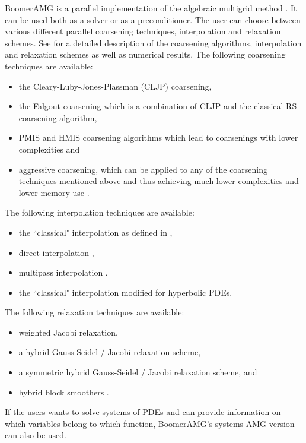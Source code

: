 BoomerAMG is a parallel implementation of the algebraic multigrid 
method \cite{Ruge_Stueben_1987}. 
It can be used
both as a solver or as a preconditioner.  The user can choose between various
different parallel coarsening techniques, interpolation and relaxation schemes.
See
\cite{VEHenson_UMYang_2002,UMYang_2005} for a detailed description of the 
coarsening
algorithms, interpolation and relaxation schemes as well as numerical results.  The following
coarsening techniques are available:
\begin{itemize}
\item the Cleary-Luby-Jones-Plassman (CLJP) coarsening,
\item the Falgout coarsening which is a combination of CLJP and the
classical RS coarsening algorithm,
\item PMIS and HMIS coarsening algorithms which lead to coarsenings with lower complexities \cite{DeSterck_Yang_Heys_2004}
and 
\item aggressive coarsening, which can be applied to any of the coarsening techniques mentioned above and thus achieving much lower complexities and lower memory use \cite{Stueben_1999}.
\end{itemize}
The following interpolation techniques are available:
\begin{itemize}
\item the ``classical" interpolation as defined in \cite{Ruge_Stueben_1987},
\item direct interpolation \cite{Stueben_1999},
\item multipass interpolation \cite{Stueben_1999}.
\item the ``classical" interpolation modified for hyperbolic PDEs.
\end{itemize}

The following relaxation techniques are available:
\begin{itemize}
\item weighted Jacobi relaxation,
\item a hybrid Gauss-Seidel / Jacobi relaxation scheme, 
\item a symmetric hybrid Gauss-Seidel / Jacobi relaxation scheme, and
\item hybrid block smoothers \cite{UMYang_2004}.
\end{itemize}

If the users wants to solve systems of PDEs and can provide information on
which variables belong to which function, BoomerAMG's systems AMG version
can also be used.

